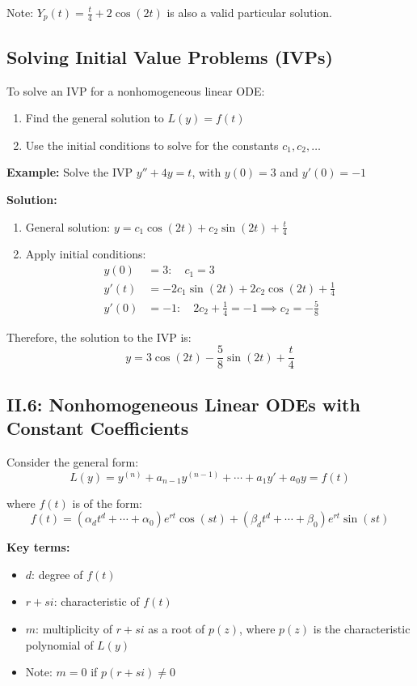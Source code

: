 \documentclass{article}
\begin{document}
Note: $Y_p(t) = \frac{t}{4} + 2\cos(2t)$ is also a valid particular solution.

\subsection*{Solving Initial Value Problems (IVPs)}

To solve an IVP for a nonhomogeneous linear ODE:
\begin{enumerate}
    \item Find the general solution to $L(y) = f(t)$
    \item Use the initial conditions to solve for the constants $c_1, c_2, \ldots$
\end{enumerate}

\textbf{Example:} Solve the IVP $y''+4y = t$, with $y(0) = 3$ and $y'(0) = -1$

\textbf{Solution:}
\begin{enumerate}
    \item General solution: $y = c_1\cos(2t) + c_2\sin(2t) + \frac{t}{4}$
    \item Apply initial conditions:
    \begin{align*}
        y(0) &= 3: \quad c_1 = 3 \\
        y'(t) &= -2c_1\sin(2t) + 2c_2\cos(2t) + \frac{1}{4} \\
        y'(0) &= -1: \quad 2c_2 + \frac{1}{4} = -1 \implies c_2 = -\frac{5}{8}
    \end{align*}
\end{enumerate}

Therefore, the solution to the IVP is:
\[
y = 3\cos(2t) - \frac{5}{8}\sin(2t) + \frac{t}{4}
\]

\subsection*{II.6: Nonhomogeneous Linear ODEs with Constant Coefficients}

Consider the general form:
\[
L(y) = y^{(n)} + a_{n-1}y^{(n-1)} + \cdots + a_1y' + a_0y = f(t)
\]

where $f(t)$ is of the form:
\[
f(t) = (\alpha_dt^d + \cdots + \alpha_0) e^{rt} \cos(st) + (\beta_dt^d + \cdots + \beta_0) e^{rt} \sin(st)
\]

\textbf{Key terms:}
\begin{itemize}
    \item $d$: degree of $f(t)$
    \item $r + si$: characteristic of $f(t)$
    \item $m$: multiplicity of $r + si$ as a root of $p(z)$, where $p(z)$ is the characteristic polynomial of $L(y)$
    \item Note: $m = 0$ if $p(r+si) \neq 0$
\end{itemize}
\end{document}
